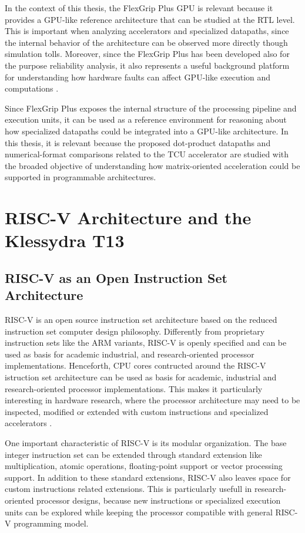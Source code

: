 In the context of this thesis, the FlexGrip Plus GPU is relevant because it provides a GPU-like reference architecture that can be studied at the RTL level. This is important when analyzing accelerators and specialized datapaths, since the internal behavior of the architecture can be observed more directly though simulation tolls. Moreover, since the FlexGrip Plus has been developed also for the purpose reliability analysis, it also represents a useful background platform for understanding how hardware faults can affect GPU-like execution and computations \cite{condia2020flexgripplus}.


Since FlexGrip Plus exposes the internal structure of the processing pipeline and execution units, it can be used as a reference environment for reasoning about how specialized datapaths could be integrated into a GPU-like architecture. In this thesis, it is relevant because the proposed dot-product datapaths and numerical-format comparisons related to the TCU accelerator are studied with the broaded objective of understanding how matrix-oriented acceleration could be supported in programmable architectures.


\section{RISC-V Architecture and the Klessydra T13}
\label{sec:riscv_klessydra_background}

\subsection{RISC-V as an Open Instruction Set Architecture}
RISC-V is an open source instruction set architecture based on the reduced instruction set computer design philosophy. Differently from proprietary instruction sets like the ARM variants, RISC-V is openly specified and can be used as basis for academic industrial, and research-oriented processor implementations. Henceforth, CPU cores contructed around the RISC-V istruction set architecture can be used as basis for academic, industrial and research-oriented processor implementations. This makes it particularly interesting in hardware research, where the processor architecture may need to be inspected, modified or extended with custom instructions and specialized accelerators \cite{riscvUnprivilegedSpec}. 

One important characteristic of RISC-V is its modular organization. The base integer instruction set can be extended through standard extension like multiplication, atomic operations, floating-point support or vector processing support. In addition to these standard extensions, RISC-V also leaves space for custom instructions related extensions. This is particularly usefull in research-oriented processor designs, because new instructions or specialized execution units can be explored while keeping the processor compatible with general RISC-V programming model. 

